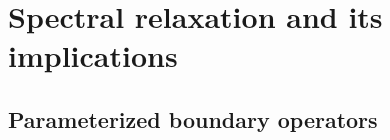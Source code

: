 \documentclass[10pt]{article}
\numberwithin{equation}{section}
\newcommand{\+}{%
	\raisebox{0.18ex}{\scaleobj{0.55}{+}}
}
\theoremstyle{definition}
\theoremstyle{definition}
\begin{document}
\section{Spectral relaxation and its implications}\label{sec:spectral_relax}

\subsection{Parameterized boundary operators}\label{sec:param_boundary}
\end{document}
